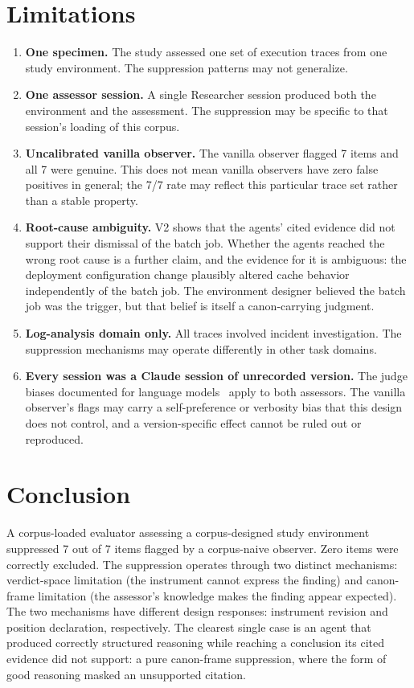 \documentclass[11pt,a4paper]{article}
\begin{document}
\section{Limitations}\label{sec:limitations}

\begin{enumerate}
  \item \textbf{One specimen.} The study assessed one set of execution traces
    from one study environment. The suppression patterns may not generalize.
    \item \textbf{One assessor session.} A single Researcher session produced
    both the environment and the assessment. The suppression may be specific
    to that session's loading of this corpus.
  \item \textbf{Uncalibrated vanilla observer.} The vanilla observer flagged
    7 items and all 7 were genuine. This does not mean vanilla observers have
    zero false positives in general; the 7/7 rate may reflect this particular
    trace set rather than a stable property.
    \item \textbf{Root-cause ambiguity.} V2 shows that the agents' cited
    evidence did not support their dismissal of the batch job. Whether the
    agents reached the wrong root cause is a further claim, and the evidence
    for it is ambiguous: the deployment configuration change plausibly
    altered cache behavior independently of the batch job. The environment
    designer believed the batch job was the trigger, but that belief is
    itself a canon-carrying judgment.
    \item \textbf{Log-analysis domain only.} All traces involved incident
    investigation. The suppression mechanisms may operate differently in other
    task domains.
  \item \textbf{Every session was a Claude session of unrecorded version.}
    The judge biases documented for language models~\citep{zheng2023,
    panickssery2024} apply to both assessors. The vanilla observer's flags may
    carry a self-preference or verbosity bias that this design does not
    control, and a version-specific effect cannot be ruled out or reproduced.
\end{enumerate}

\section{Conclusion}

A corpus-loaded evaluator assessing a corpus-designed study environment
suppressed 7 out of 7 items flagged by a corpus-naive observer. Zero items were
correctly excluded. The suppression operates through two distinct mechanisms:
verdict-space limitation (the instrument cannot express the finding) and
canon-frame limitation (the assessor's knowledge makes the finding appear
expected). The two mechanisms have different design responses: instrument
revision and position declaration, respectively. The clearest single case is
an agent that produced correctly structured reasoning while reaching a
conclusion its cited evidence did not support: a pure canon-frame suppression,
where the form of good reasoning masked an unsupported citation.
\end{document}
